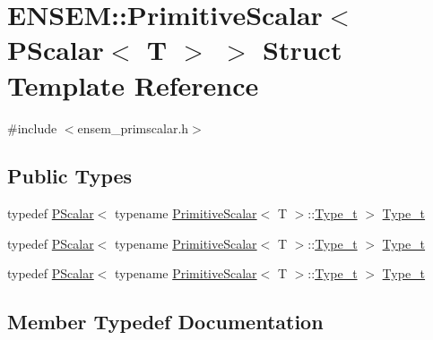 \hypertarget{structENSEM_1_1PrimitiveScalar_3_01PScalar_3_01T_01_4_01_4}{}\section{E\+N\+S\+EM\+:\+:Primitive\+Scalar$<$ P\+Scalar$<$ T $>$ $>$ Struct Template Reference}
\label{structENSEM_1_1PrimitiveScalar_3_01PScalar_3_01T_01_4_01_4}


{\ttfamily \#include $<$ensem\+\_\+primscalar.\+h$>$}

\subsection*{Public Types}
\begin{DoxyCompactItemize}
\item 
typedef \mbox{\hyperlink{classENSEM_1_1PScalar}{P\+Scalar}}$<$ typename \mbox{\hyperlink{structENSEM_1_1PrimitiveScalar}{Primitive\+Scalar}}$<$ T $>$\+::\mbox{\hyperlink{structENSEM_1_1PrimitiveScalar_3_01PScalar_3_01T_01_4_01_4_a3b7d612e567079b69a727ff98d74563e}{Type\+\_\+t}} $>$ \mbox{\hyperlink{structENSEM_1_1PrimitiveScalar_3_01PScalar_3_01T_01_4_01_4_a3b7d612e567079b69a727ff98d74563e}{Type\+\_\+t}}
\item 
typedef \mbox{\hyperlink{classENSEM_1_1PScalar}{P\+Scalar}}$<$ typename \mbox{\hyperlink{structENSEM_1_1PrimitiveScalar}{Primitive\+Scalar}}$<$ T $>$\+::\mbox{\hyperlink{structENSEM_1_1PrimitiveScalar_3_01PScalar_3_01T_01_4_01_4_a3b7d612e567079b69a727ff98d74563e}{Type\+\_\+t}} $>$ \mbox{\hyperlink{structENSEM_1_1PrimitiveScalar_3_01PScalar_3_01T_01_4_01_4_a3b7d612e567079b69a727ff98d74563e}{Type\+\_\+t}}
\item 
typedef \mbox{\hyperlink{classENSEM_1_1PScalar}{P\+Scalar}}$<$ typename \mbox{\hyperlink{structENSEM_1_1PrimitiveScalar}{Primitive\+Scalar}}$<$ T $>$\+::\mbox{\hyperlink{structENSEM_1_1PrimitiveScalar_3_01PScalar_3_01T_01_4_01_4_a3b7d612e567079b69a727ff98d74563e}{Type\+\_\+t}} $>$ \mbox{\hyperlink{structENSEM_1_1PrimitiveScalar_3_01PScalar_3_01T_01_4_01_4_a3b7d612e567079b69a727ff98d74563e}{Type\+\_\+t}}
\end{DoxyCompactItemize}


\subsection{Member Typedef Documentation}
\mbox{\label{structENSEM_1_1PrimitiveScalar_3_01PScalar_3_01T_01_4_01_4_a3b7d612e567079b69a727ff98d74563e}} 

